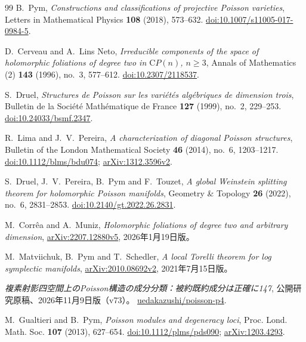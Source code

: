 \begin{thebibliography}{99}
B.~Pym,
\emph{Constructions and classifications of projective Poisson varieties},
Letters in Mathematical Physics \textbf{108} (2018), 573--632.
\href{https://doi.org/10.1007/s11005-017-0984-5}{doi:10.1007/s11005-017-0984-5}.

D.~Cerveau and A.~Lins Neto,
\emph{Irreducible components of the space of holomorphic foliations
of degree two in $\mathrm{C}P(n)$, $n\ge3$},
Annals of Mathematics (2) \textbf{143} (1996), no.~3, 577--612.
\href{https://doi.org/10.2307/2118537}{doi:10.2307/2118537}.

S.~Druel,
\emph{Structures de Poisson sur les vari\'et\'es alg\'ebriques de dimension trois},
Bulletin de la Soci\'et\'e Math\'ematique de France
\textbf{127} (1999), no.~2, 229--253.
\href{https://doi.org/10.24033/bsmf.2347}{doi:10.24033/bsmf.2347}.

R.~Lima and J.~V.~Pereira,
\emph{A characterization of diagonal Poisson structures},
Bulletin of the London Mathematical Society \textbf{46} (2014), no.~6, 1203--1217.
\href{https://doi.org/10.1112/blms/bdu074}{doi:10.1112/blms/bdu074};
\href{https://arxiv.org/abs/1312.3596v2}{arXiv:1312.3596v2}.

S.~Druel, J.~V.~Pereira, B.~Pym and F.~Touzet,
\emph{A global Weinstein splitting theorem for holomorphic Poisson manifolds},
Geometry \& Topology \textbf{26} (2022), no.~6, 2831--2853.
\href{https://doi.org/10.2140/gt.2022.26.2831}{doi:10.2140/gt.2022.26.2831}.

M.~Corr\^ea and A.~Muniz,
\emph{Holomorphic foliations of degree two and arbitrary dimension},
\href{https://arxiv.org/abs/2207.12880v5}{arXiv:2207.12880v5},
2026年1月19日版。

M.~Matviichuk, B.~Pym and T.~Schedler,
\emph{A local Torelli theorem for log symplectic manifolds},
\href{https://arxiv.org/abs/2010.08692v2}{arXiv:2010.08692v2},
2021年7月15日版。

\emph{複素射影四空間上のPoisson構造の成分分類：被約既約成分は正確に147},
公開研究原稿、2026年11月9日版（v73）。
\href{https://github.com/uedakazushi/poisson-p4/blob/f118dfbfc5bb9b7a394d1985b4800b6228eebaf6/papers/poisson_p4_classification_ja.tex}{uedakazushi/poisson-p4}.

M.~Gualtieri and B.~Pym,
\emph{Poisson modules and degeneracy loci},
Proc. Lond. Math. Soc. \textbf{107} (2013), 627--654.
\href{https://doi.org/10.1112/plms/pds090}{doi:10.1112/plms/pds090};
\href{https://arxiv.org/abs/1203.4293}{arXiv:1203.4293}.


\end{thebibliography}
